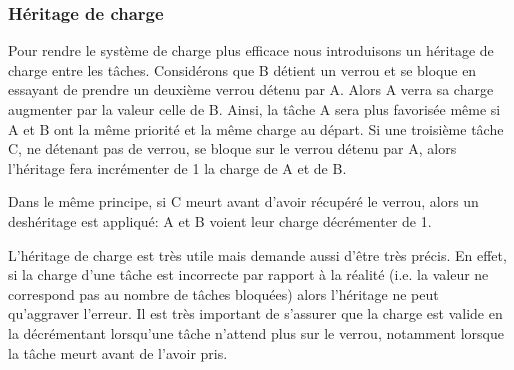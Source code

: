 \subsubsection{Héritage de charge}

Pour rendre le système de charge plus efficace nous introduisons un héritage
de charge entre les tâches. Considérons que B détient un verrou et se bloque
en essayant de prendre un deuxième verrou détenu par A. Alors A verra sa
charge augmenter par la valeur celle de B. Ainsi, la tâche A sera plus favorisée même
si A et B ont la même priorité et la même charge au départ. Si une troisième tâche C,
ne détenant pas de verrou, se bloque sur le verrou détenu par A, alors l'héritage fera incrémenter
de 1 la charge de A et de B.

Dans le même principe, si C meurt avant d'avoir récupéré le verrou, alors un deshéritage est
appliqué: A et B voient leur charge décrémenter de 1.

L'héritage de charge est très utile mais demande aussi d'être très précis.
En effet, si la charge d'une tâche est incorrecte par rapport à la réalité
(i.e. la valeur ne correspond pas au nombre de tâches bloquées)
alors l'héritage ne peut qu'aggraver l'erreur. Il est très important
de s'assurer que la charge est valide en la décrémentant lorsqu'une tâche 
n'attend plus sur le verrou, notamment lorsque la tâche meurt avant de l'avoir pris.
